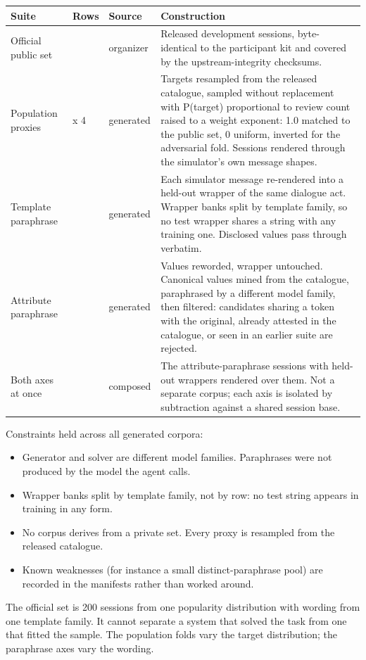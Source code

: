\documentclass[11pt,a4paper]{article}
\begin{document}
{\small\begin{longtable}{@{}>{\RaggedRight\arraybackslash}p{}>{\RaggedRight\arraybackslash}p{}>{\RaggedRight\arraybackslash}p{}>{\RaggedRight\arraybackslash}p{}@{}}
\toprule \textbf{Suite} & \textbf{Rows} & \textbf{Source} & \textbf{Construction} \\ \midrule \endhead
Official public set & 200 & organizer & Released development sessions, byte-identical to the participant kit and covered by the upstream-integrity checksums. \\[1.5pt]
Population proxies & 800 x 4 & generated & Targets resampled from the released catalogue, sampled without replacement with P(target) proportional to review count raised to a weight exponent: 1.0 matched to the public set, 0 uniform, inverted for the adversarial fold. Sessions rendered through the simulator's own message shapes. \\[1.5pt]
Template paraphrase & 200 & generated & Each simulator message re-rendered into a held-out wrapper of the same dialogue act. Wrapper banks split by template family, so no test wrapper shares a string with any training one. Disclosed values pass through verbatim. \\[1.5pt]
Attribute paraphrase & 200 & generated & Values reworded, wrapper untouched. Canonical values mined from the catalogue, paraphrased by a different model family, then filtered: candidates sharing a token with the original, already attested in the catalogue, or seen in an earlier suite are rejected. \\[1.5pt]
Both axes at once & 200 & composed & The attribute-paraphrase sessions with held-out wrappers rendered over them. Not a separate corpus; each axis is isolated by subtraction against a shared session base. \\[1.5pt]
\bottomrule\end{longtable}}
Constraints held across all generated corpora:

\begin{itemize}[leftmargin=*,itemsep=1pt,parsep=0pt,topsep=2pt]
\item Generator and solver are different model families. Paraphrases were not produced by the model the agent calls.
\item Wrapper banks split by template family, not by row: no test string appears in training in any form.
\item No corpus derives from a private set. Every proxy is resampled from the released catalogue.
\item Known weaknesses (for instance a small distinct-paraphrase pool) are recorded in the manifests rather than worked around.
\end{itemize}
The official set is 200 sessions from one popularity distribution with wording from one template family. It cannot separate a system that solved the task from one that fitted the sample. The population folds vary the target distribution; the paraphrase axes vary the wording.
\end{document}
